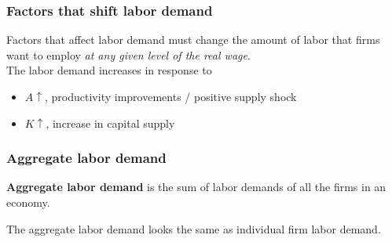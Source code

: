 \subsubsection{Factors that shift labor demand}
\begin{remark}
Factors that affect labor demand must change the amount of labor that firms want to employ \textit{at any given level of the real wage}.\\

The labor demand increases in response to 
\begin{itemize}
    \item $A \uparrow$, productivity improvements / positive supply shock
    \item $K \uparrow$, increase in capital supply
\end{itemize} 

\begin{center}
\end{center}
\end{remark}

\subsubsection{Aggregate labor demand}

\begin{definition}
    \textbf{Aggregate labor demand} is the sum of labor demands of all the firms in an economy. 
\end{definition}

\begin{remark} 
    The aggregate labor demand looks the same as individual firm labor demand.
\end{remark}

